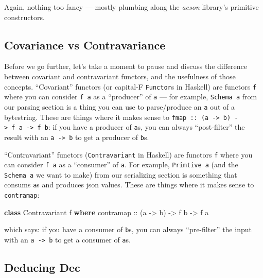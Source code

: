 \documentclass[]{article}
\newenvironment{Shaded}{}{}
\newcommand{\DataTypeTok}[1]{\textcolor[rgb]{0.56,0.13,0.00}{#1}}
\newcommand{\KeywordTok}[1]{\textcolor[rgb]{0.00,0.44,0.13}{\textbf{#1}}}
\newcommand{\NormalTok}[1]{#1}
\newcommand{\OtherTok}[1]{\textcolor[rgb]{0.00,0.44,0.13}{#1}}
\begin{document}
Again, nothing too fancy --- mostly plumbing along the \emph{aeson} library's
primitive constructors.

\hypertarget{covariance-vs-contravariance}{%
\subsection{Covariance vs Contravariance}\label{covariance-vs-contravariance}}

Before we go further, let's take a moment to pause and discuss the difference
between covariant and contravariant functors, and the usefulness of those
concepts. ``Covariant'' functors (or capital-F \texttt{Functor}s in Haskell) are
functors \texttt{f} where you can consider \texttt{f\ a} as a ``producer'' of
\texttt{a} --- for example, \texttt{Schema\ a} from our parsing section is a
thing you can use to parse/produce an \texttt{a} out of a bytestring. These are
things where it makes sense to
\texttt{fmap\ ::\ (a\ -\textgreater{}\ b)\ -\textgreater{}\ f\ a\ -\textgreater{}\ f\ b}:
if you have a producer of \texttt{a}s, you can always ``post-filter'' the result
with an \texttt{a\ -\textgreater{}\ b} to get a producer of \texttt{b}s.

``Contravariant'' functors (\texttt{Contravariant} in Haskell) are functors
\texttt{f} where you can consider \texttt{f\ a} as a ``consumer'' of \texttt{a}.
For example, \texttt{Primtive\ a} (and the \texttt{Schema\ a} we want to make)
from our serializing section is something that consums \texttt{a}s and produces
json values. These are things where it makes sense to \texttt{contramap}:

\begin{Shaded}
\begin{Highlighting}[]
\KeywordTok{class} \DataTypeTok{Contravariant}\NormalTok{ f }\KeywordTok{where}
\OtherTok{    contramap ::}\NormalTok{ (a }\OtherTok{{-}>}\NormalTok{ b) }\OtherTok{{-}>}\NormalTok{ f b }\OtherTok{{-}>}\NormalTok{ f a}
\end{Highlighting}
\end{Shaded}

which says: if you have a consumer of \texttt{b}s, you can always ``pre-filter''
the input with an \texttt{a\ -\textgreater{}\ b} to get a consumer of
\texttt{a}s.

\hypertarget{deducing-dec}{%
\subsection{Deducing Dec}\label{deducing-dec}}
\end{document}
